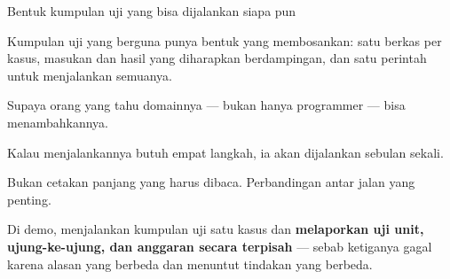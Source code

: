 \documentclass[aspectratio=169,11pt,t]{beamer}
\begin{document}
\begin{frame}[shrink=25]{Bentuk kumpulan uji yang bisa dijalankan siapa pun}
{\fontsize{9.4}{12.6}\selectfont\color{fg2}Kumpulan uji yang berguna punya bentuk yang membosankan: satu berkas per kasus, masukan dan hasil yang diharapkan berdampingan, dan satu perintah untuk menjalankan semuanya.\par}\vskip 4pt
\begin{minipage}[t]{0.3253\textwidth}
\begin{icard}
Supaya orang yang tahu domainnya --- bukan hanya programmer --- bisa menambahkannya.
\end{icard}
\end{minipage}%
\hfill
\begin{minipage}[t]{0.3253\textwidth}
\begin{icard}
Kalau menjalankannya butuh empat langkah, ia akan dijalankan sebulan sekali.
\end{icard}
\end{minipage}%
\hfill
\begin{minipage}[t]{0.3253\textwidth}
\begin{icard}
Bukan cetakan panjang yang harus dibaca. Perbandingan antar jalan yang penting.
\end{icard}
\end{minipage}%
\begin{iband}[signal]
Di demo,  menjalankan kumpulan uji satu kasus dan \textbf{melaporkan uji unit, ujung-ke-ujung, dan anggaran secara terpisah} --- sebab ketiganya gagal karena alasan yang berbeda dan menuntut tindakan yang berbeda.
\end{iband}
\end{frame}
\end{document}
